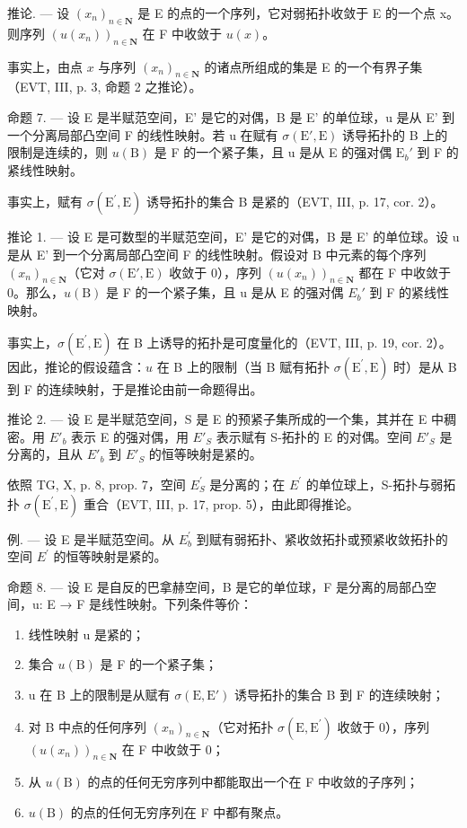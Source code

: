 推论. --- 设 \((x_{n})_{n\in\mathbf{N}}\) 是 E 的点的一个序列，它对弱拓扑收敛于 E 的一个点 x。则序列 \((u(x_{n}))_{n\in\mathbf{N}}\) 在 F 中收敛于 \(u(x)\)。

事实上，由点 \(x\) 与序列 \((x_{n})_{n\in \mathbf{N}}\) 的诸点所组成的集是 E 的一个有界子集（EVT, III, p. 3, 命题 2 之推论）。

命题 7. --- 设 E 是半赋范空间，E' 是它的对偶，B 是 E' 的单位球，u 是从 E' 到一个分离局部凸空间 F 的线性映射。若 u 在赋有 \(\sigma(\mathrm{E}',\mathrm{E})\) 诱导拓扑的 B 上的限制是连续的，则 \(u(\mathrm{B})\) 是 F 的一个紧子集，且 u 是从 E 的强对偶 \(\mathrm{E}_b'\) 到 F 的紧线性映射。

事实上，赋有 \(\sigma(\mathrm{E}^{\prime},\mathrm{E})\) 诱导拓扑的集合 B 是紧的（EVT, III, p. 17, cor. 2）。

推论 1. --- 设 E 是可数型的半赋范空间，E' 是它的对偶，B 是 E' 的单位球。设 u 是从 E' 到一个分离局部凸空间 F 的线性映射。假设对 B 中元素的每个序列 \((x_{n})_{n\in\mathbf{N}}\)（它对 \(\sigma(\mathrm{E}',\mathrm{E})\) 收敛于 0），序列 \((u(x_{n}))_{n\in\mathbf{N}}\) 都在 F 中收敛于 0。那么，\(u(\mathrm{B})\) 是 F 的一个紧子集，且 u 是从 E 的强对偶 \(E_{b}'\) 到 F 的紧线性映射。

事实上，\(\sigma(\mathrm{E}^{\prime},\mathrm{E})\) 在 B 上诱导的拓扑是可度量化的（EVT, III, p. 19, cor. 2）。因此，推论的假设蕴含：\(u\) 在 B 上的限制（当 B 赋有拓扑 \(\sigma(\mathrm{E}^{\prime},\mathrm{E})\) 时）是从 B 到 F 的连续映射，于是推论由前一命题得出。

推论 2. --- 设 E 是半赋范空间，S 是 E 的预紧子集所成的一个集，其并在 E 中稠密。用 \(E'_{b}\) 表示 E 的强对偶，用 \(E'_{S}\) 表示赋有 S-拓扑的 E 的对偶。空间 \(E'_{S}\) 是分离的，且从 \(E'_{b}\) 到 \(E'_{S}\) 的恒等映射是紧的。

依照 TG, X, p. 8, prop. 7，空间 \(E_{S}^{\prime}\) 是分离的；在 \(E^{\prime}\) 的单位球上，S-拓扑与弱拓扑 \(\sigma(\mathrm{E}^{\prime},\mathrm{E})\) 重合（EVT, III, p. 17, prop. 5），由此即得推论。

例. --- 设 E 是半赋范空间。从 \(E_{b}^{\prime}\) 到赋有弱拓扑、紧收敛拓扑或预紧收敛拓扑的空间 \(E^{\prime}\) 的恒等映射是紧的。

命题 8. --- 设 E 是自反的巴拿赫空间，B 是它的单位球，F 是分离的局部凸空间，u: E → F 是线性映射。下列条件等价：

\begin{enumerate}
\def\labelenumi{(\roman{enumi})}
\item
  线性映射 u 是紧的；
\item
  集合 \(u(\mathrm{B})\) 是 F 的一个紧子集；
\item
  u 在 B 上的限制是从赋有 \(\sigma(\mathrm{E},\mathrm{E}')\) 诱导拓扑的集合 B 到 F 的连续映射；
\item
  对 B 中点的任何序列 \((x_{n})_{n\in \mathbf{N}}\)（它对拓扑 \(\sigma (\mathrm{E},\mathrm{E}^{\prime})\) 收敛于 0），序列 \((u(x_n))_{n\in \mathbf{N}}\) 在 F 中收敛于 0；
\item
  从 \(u(\mathrm{B})\) 的点的任何无穷序列中都能取出一个在 F 中收敛的子序列；
\item
  \(u(\mathrm{B})\) 的点的任何无穷序列在 F 中都有聚点。
\end{enumerate}

